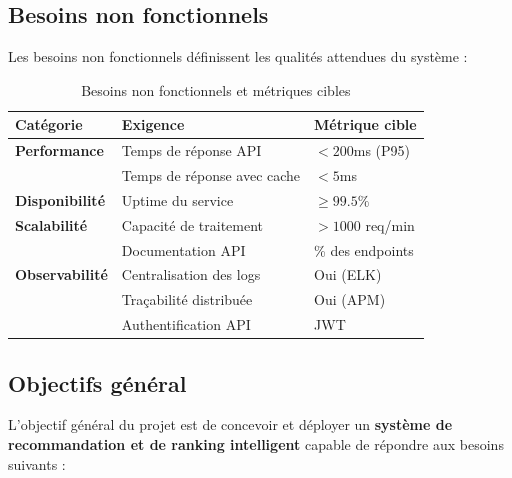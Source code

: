 \documentclass[11pt,a4paper]{report}
\newcommand{\concept}[1]{\textcolor{arasPrimary}{\textbf{#1}}}
\begin{document}
\subsection{Besoins non fonctionnels}

Les besoins non fonctionnels définissent les qualités attendues du système :

\begin{table}[H]
\centering
\caption{Besoins non fonctionnels et métriques cibles}
\label{tab:nfr}
\begin{tabular}{>{\raggedright}p{3cm} >{\raggedright}p{6cm} >{\raggedright\arraybackslash}p{4cm}}
\toprule
\textbf{Catégorie} & \textbf{Exigence} & \textbf{Métrique cible} \\
\midrule
\rowcolor{arasLight}
\textbf{Performance} & Temps de réponse API & $< 200$ms (P95) \\
 & Temps de réponse avec cache & $< 5$ms \\
\rowcolor{arasLight}
\textbf{Disponibilité} & Uptime du service & $\geq 99.5\%$ \\
\textbf{Scalabilité} & Capacité de traitement & $> 1000$ req/min \\
\rowcolor{arasLight}
 & Documentation API & 100\% des endpoints \\
\rowcolor{arasLight}
\textbf{Observabilité} & Centralisation des logs & Oui (ELK) \\
 & Traçabilité distribuée & Oui (APM) \\
\rowcolor{arasLight}
 & Authentification API & JWT \\
\bottomrule
\end{tabular}
\end{table}

\subsection{Objectifs général}

L'objectif général du projet est de concevoir et déployer un \concept{système de recommandation et de ranking intelligent} capable de répondre aux besoins suivants :
\end{document}
